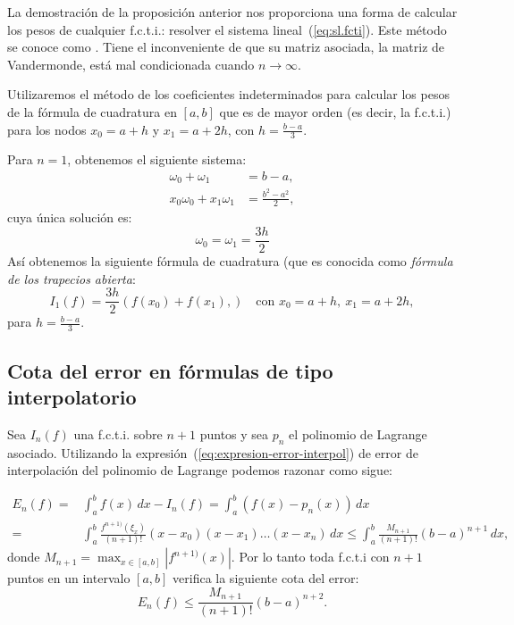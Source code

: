 \begin{remark}
  \label{rk:6}
  La demostración de la proposición anterior nos proporciona una forma
  de calcular los pesos de cualquier f.c.t.i.: resolver el sistema
lineal~(\ref{eq:sl.fcti}). Este método se conoce como . Tiene el inconveniente de que su
matriz asociada, la matriz de Vandermonde, está mal condicionada
  cuando $n\to\infty$.
\end{remark}

\begin{example}
  \label{ex:coef-indetermin:formula-trapecios-abierta}
  Utilizaremos el método de los coeficientes indeterminados para
  calcular los pesos de la fórmula de cuadratura en $[a,b]$ que es de
  mayor orden (es decir, la f.c.t.i.) para los nodos $x_0=a+h$ y
  $x_1=a+2h$, con $h=\frac{b-a}{3}$.
  
  Para $n=1$, obtenemos el siguiente sistema:
  \begin{align*}
    \omega_0 + \omega_1 &= b-a,
    \\ 
    x_0\omega_0 + x_1\omega_1 &= \frac{b^2-a^2}{2},
  \end{align*}
  cuya única solución es:
  \begin{equation*}
    \omega_0=\omega_1=\frac{3h}{2}
  \end{equation*}
  Así obtenemos la siguiente fórmula de cuadratura (que es conocida
  como \textit{fórmula de los trapecios abierta}:
  \begin{equation*}
    I_1(f)=\frac{3h}{2}
    \left(
      f(x_0)+f(x_1),
    \right)
    \quad \text{con } x_0=a+h, \ x_1=a+2h,
  \end{equation*}
  para $h=\frac{b-a}{3}$.
\end{example}

\subsection*{Cota del error en fórmulas de tipo interpolatorio}

Sea $I_n(f)$ una f.c.t.i. sobre $n+1$ puntos y sea $p_n$ el polinomio
de Lagrange asociado.  Utilizando la
expresión~(\ref{eq:expresion-error-interpol}) de error de
interpolación del polinomio de Lagrange podemos razonar como sigue:

\begin{align*}
  E_n(f)=&\int_a^b f(x)\, dx - I_n(f) =
  \int_a^b\left(f(x)-p_n(x)\right)\,dx 
  \\
  =&\int_a^b \frac{f^{n+1)}(\xi_x)}{(n+1)!} (x-x_0)(x-x_1)\dots(x-x_n) \,dx
  \le \int_a^b  \frac{M_{n+1}}{(n+1)!} (b-a)^{n+1} \, dx,
\end{align*}
donde $M_{n+1}=\max_{x\in [a,b]} |f^{n+1)}(x)|$.
Por lo tanto toda f.c.t.i con $n+1$ puntos en un intervalo $[a,b]$
verifica la siguiente cota del error:
\begin{equation}
  E_n(f) \le  \frac{M_{n+1}}{(n+1)!} (b-a)^{n+2}.
  \label{eq:cota-error-fcti}
\end{equation}


